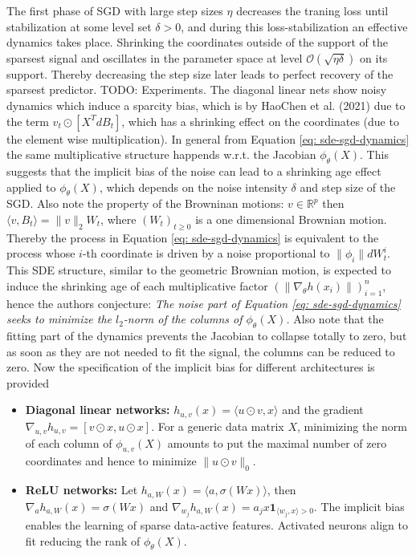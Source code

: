 The first phase of SGD with large step sizes $\eta$ decreases the traning
loss until stabilization at some level set $\delta > 0$, and during this
loss-stabilization an effective dynamics takes place. Shrinking the
coordinates outside of the support of the sparsest signal and oscillates in
the parameter space at level $\mathcal{O}(\sqrt{\eta\delta})$ on its support.
Thereby decreasing the step size later leads to perfect recovery of the
sparsest predictor. TODO: Experiments.
\newline
The diagonal linear nets show noisy dynamics which induce a sparcity bias,
which is by HaoChen et al. (2021) due to the term $v_t \odot [X^{T}dB_t]$,
which has a shrinking effect on the coordinates (due to the element wise
multiplication). In general from Equation \ref{eq: sde-sgd-dynamics} the same
multiplicative structure happends w.r.t. the Jacobian $\phi_\theta(X)$. This
suggests that the implicit bias of the noise can lead to a shrinking age
effect applied to $\phi_\theta(X)$, which depends on the noise intensity
$\delta$ and step size of the SGD. Also note the property of the Browninan
motions: $v \in \mathbb{R}^{p}$ then $\langle v, B_t\rangle = \|v\|_2 W_t$,
where $(W_t)_{t\ge 0}$ is a one dimensional Brownian motion. Thereby the
process in Equation \ref{eq: sde-sgd-dynamics} is equivalent to the process
whose $i$-th coordinate is driven by a noise proportional to
$\|\phi_i\|dW_{t}^{i}$. This SDE structure, similar to the geometric
Brownian motion, is expected to induce the shrinking age of each
multiplicative factor $(\|\nabla_\theta h(x_i)\|)_{i=1}^{n}$, hence the
authors conjecture: \textit{The noise part of Equation
\ref{eq: sde-sgd-dynamics} seeks to minimize the $l_2$-norm of the columns
of $\phi_\theta(X)$.}
\newline
Also note that the fitting part of the dynamics prevents the Jacobian to
collapse totally to zero, but as soon as they are not needed to fit the
signal, the columns can be reduced to zero. Now the specification of the
implicit bias for different architectures is provided
\begin{itemize}
    \item \textbf{Diagonal linear networks:} $h_{u, v}(x) = \langle u \odot v,
        x\rangle$ and the gradient $\nabla_{u, v}h_{u,v}= [v\odot x, u \odot
        x]$. For a generic data matrix $X$, minimizing the norm of each
        column of $\phi_{u, v}(X)$ amounts to put the maximal number of zero
        coordinates and hence to minimize $\|u \odot v\|_0$.

    \item \textbf{ReLU networks:} Let $h_{a, W}(x) = \langle a,
        \sigma(Wx)\rangle$, then $\nabla_{a}h_{a, W}(x) = \sigma(Wx)$ and
        $\nabla_{w_j}h_{a, W}(x) = a_j x \mathbf{1}_{\langle w_j, x\rangle >
        0}$. The implicit bias enables the learning of sparse data-active
        features. Activated neurons align to fit reducing the rank of
        $\phi_\theta(X)$.
\end{itemize}

